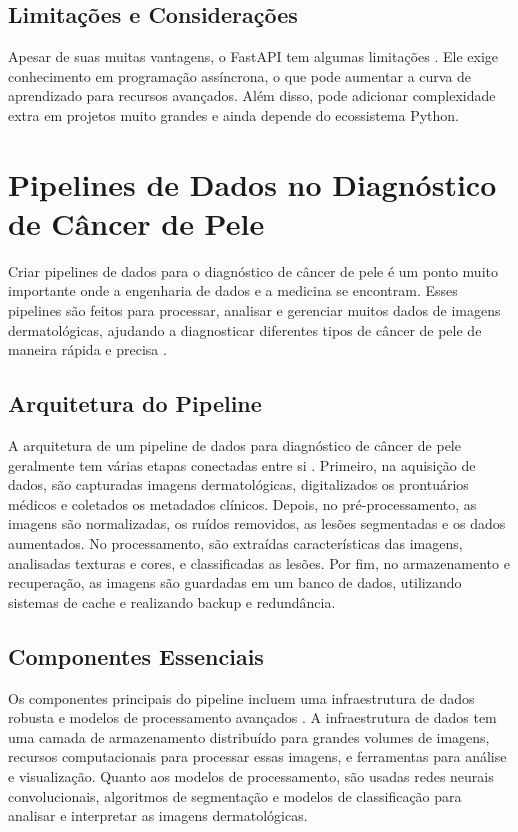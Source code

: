 \subsection{Limitações e Considerações}
Apesar de suas muitas vantagens, o FastAPI tem algumas limitações \cite{kumar2023modern}. Ele exige conhecimento em programação assíncrona, o que pode aumentar a curva de aprendizado para recursos avançados. Além disso, pode adicionar complexidade extra em projetos muito grandes e ainda depende do ecossistema Python.


\section{Pipelines de Dados no Diagnóstico de Câncer de Pele}
Criar pipelines de dados para o diagnóstico de câncer de pele é um ponto muito importante onde a engenharia de dados e a medicina se encontram. Esses pipelines são feitos para processar, analisar e gerenciar muitos dados de imagens dermatológicas, ajudando a diagnosticar diferentes tipos de câncer de pele de maneira rápida e precisa \cite{zhang2021deep}.
\subsection{Arquitetura do Pipeline}
A arquitetura de um pipeline de dados para diagnóstico de câncer de pele geralmente tem várias etapas conectadas entre si \cite{esteva2022deep}. Primeiro, na aquisição de dados, são capturadas imagens dermatológicas, digitalizados os prontuários médicos e coletados os metadados clínicos. Depois, no pré-processamento, as imagens são normalizadas, os ruídos removidos, as lesões segmentadas e os dados aumentados. No processamento, são extraídas características das imagens, analisadas texturas e cores, e classificadas as lesões. Por fim, no armazenamento e recuperação, as imagens são guardadas em um banco de dados, utilizando sistemas de cache e realizando backup e redundância.
\subsection{Componentes Essenciais}
Os componentes principais do pipeline incluem uma infraestrutura de dados robusta e modelos de processamento avançados \cite{kumar2023medical}. A infraestrutura de dados tem uma camada de armazenamento distribuído para grandes volumes de imagens, recursos computacionais para processar essas imagens, e ferramentas para análise e visualização. Quanto aos modelos de processamento, são usadas redes neurais convolucionais, algoritmos de segmentação e modelos de classificação para analisar e interpretar as imagens dermatológicas.
